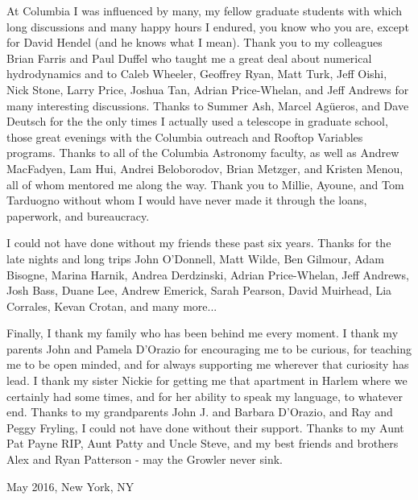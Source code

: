 At Columbia I was influenced by many, my fellow graduate students with which
long discussions and many happy hours I endured, you know who you are,  except
for David Hendel (and he knows what I mean).  Thank you to my colleagues
Brian Farris and Paul Duffel who taught me a great deal about numerical
hydrodynamics and to Caleb Wheeler, Geoffrey Ryan, Matt Turk, Jeff Oishi, Nick
Stone, Larry Price, Joshua Tan, Adrian Price-Whelan, and Jeff Andrews
for many interesting discussions. Thanks to Summer Ash, Marcel Ag\"ueros, and
Dave Deutsch for the the only times I actually used a telescope in graduate
school, those great evenings with the Columbia outreach and Rooftop Variables
programs. Thanks to all of the Columbia Astronomy faculty, as well as Andrew
MacFadyen, Lam Hui, Andrei Beloborodov, Brian Metzger, and Kristen Menou, all
of whom mentored me along the way. Thank you to Millie, Ayoune, and Tom
Tarduogno without whom I would have never made it through the loans,
paperwork, and bureaucracy.

\vspace{-0.1cm}

I could not have done without my friends these past six years. Thanks for the
late nights and long trips John O'Donnell, Matt Wilde, Ben Gilmour, Adam
Bisogne, Marina Harnik, Andrea Derdzinski, Adrian Price-Whelan, Jeff Andrews,
Josh Bass, Duane Lee, Andrew Emerick, Sarah Pearson, David Muirhead, Lia Corrales, Kevan
Crotan, and many more...

\vspace{-0.1cm}

Finally, I thank my family who has been behind me every moment. I thank my
parents John and Pamela D'Orazio for encouraging me to be curious, for
teaching me to be open minded, and for always supporting me wherever that
curiosity has lead. I thank my sister Nickie for getting me that apartment in
Harlem where we certainly had some times, and for her ability to speak my
language, to whatever end. Thanks to my grandparents John J. and Barbara
D'Orazio, and Ray and Peggy Fryling, I could not have done without their
support. Thanks to my Aunt Pat Payne RIP, Aunt Patty and Uncle Steve, and my
best friends and brothers Alex and Ryan Patterson - may the Growler never
sink.




















\vspace{0.5cm}
May 2016, New York, NY

